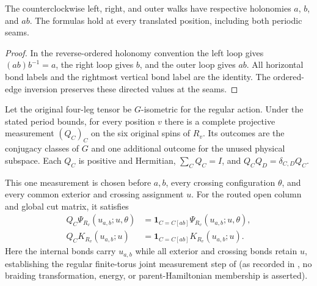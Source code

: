 \begin{lemma}%
    \label{thm:peps_torus_joint_flux_holonomy}
    \leanok
    The counterclockwise left, right, and outer walks have respective
    holonomies $a$, $b$, and $ab$. The formulas hold at every translated
    position, including both periodic seams.
\end{lemma}

\begin{proof}\leanok
    In the reverse-ordered holonomy convention the left loop gives
    $(ab)b^{-1}=a$, the right loop gives $b$, and the outer loop gives $ab$.
    All horizontal bond labels and the rightmost vertical bond label are the
    identity. The ordered-edge inversion preserves these directed values
    at the seams.
\end{proof}

\begin{lemma}%
    \label{thm:peps_torus_joint_flux_physical_measurement}
    \leanok
    Let the original four-leg tensor be $G$-isometric for the regular action.
    Under the stated period bounds, for every position $v$ there is a complete
    projective measurement $(Q_C)_C$ on the six original spins of $R_v$.
    Its outcomes are the conjugacy classes of $G$ and one additional outcome
    for the unused physical subspace. Each $Q_C$ is positive and Hermitian,
    $\sum_C Q_C=I$, and $Q_CQ_D=\delta_{C,D}Q_C$.

    This one measurement is chosen before $a,b$, every crossing configuration
    $\theta$, and every common exterior and crossing assignment $u$. For the
    routed open column and global cut matrix, it satisfies
    \begin{align}
        Q_C\Psi_{R_v}(u_{a,b};u,\theta)
         & =\mathbf 1_{C=C[ab]}\Psi_{R_v}(u_{a,b};u,\theta), \\
        Q_CK_{R_v}(u_{a,b};u)
         & =\mathbf 1_{C=C[ab]}K_{R_v}(u_{a,b};u).
    \end{align}
    Here the internal bonds carry $u_{a,b}$ while all exterior and crossing
    bonds retain $u$, establishing the regular finite-torus joint measurement
    step of \cite[braiding passage]{Schuch2010PEPS} (as recorded in
    \cite{gap:rmp_peps_quantum_double_g_isometry}, no braiding transformation,
    energy, or parent-Hamiltonian membership is asserted).
\end{lemma}

